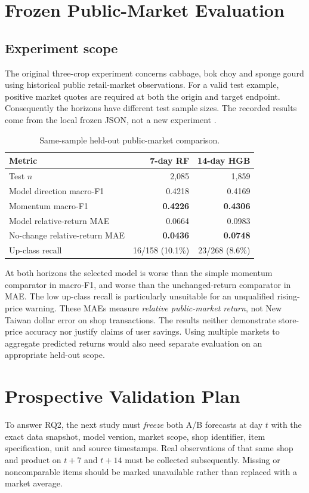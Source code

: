 \documentclass[11pt,a4paper]{article}
\begin{document}
\section{Frozen Public-Market Evaluation}
\subsection{Experiment scope}
The original three-crop experiment concerns cabbage, bok choy and sponge gourd using historical public retail-market observations. For a valid test example, positive market quotes are required at both the origin and target endpoint. Consequently the horizons have different test sample sizes. The recorded results come from the local frozen JSON, not a new experiment \cite{fmpafrozen}.

\begin{table}[ht]
\centering
\caption{Same-sample held-out public-market comparison.}
\label{tab:results}
\small
\begin{tabular}{@{}lrr@{}}
\toprule
Metric & 7-day RF & 14-day HGB\\
\midrule
Test $n$ & 2,085 & 1,859\\
Model direction macro-F1 & 0.4218 & 0.4169\\
Momentum macro-F1 & \textbf{0.4226} & \textbf{0.4306}\\
Model relative-return MAE & 0.0664 & 0.0983\\
No-change relative-return MAE & \textbf{0.0436} & \textbf{0.0748}\\
Up-class recall & 16/158 (10.1\%) & 23/268 (8.6\%)\\
\bottomrule
\end{tabular}
\end{table}

At both horizons the selected model is worse than the simple momentum comparator in macro-F1, and worse than the unchanged-return comparator in MAE. The low up-class recall is particularly unsuitable for an unqualified rising-price warning. These MAEs measure \emph{relative public-market return}, not New Taiwan dollar error on shop transactions. The results neither demonstrate store-price accuracy nor justify claims of user savings. Using multiple markets to aggregate predicted returns would also need separate evaluation on an appropriate held-out scope.

\section{Prospective Validation Plan}
To answer RQ2, the next study must \emph{freeze} both A/B forecasts at day $t$ with the exact data snapshot, model version, market scope, shop identifier, item specification, unit and source timestamps. Real observations of that same shop and product on $t+7$ and $t+14$ must be collected subsequently. Missing or noncomparable items should be marked unavailable rather than replaced with a market average.
\end{document}
